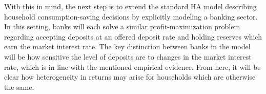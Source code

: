 \par With this in mind, the next step is to extend the standard HA model describing household consumption-saving decisions by explicitly modeling a banking sector. In this setting, banks will each solve a similar profit-maximization problem regarding accepting deposits at an offered deposit rate and holding reserves which earn the market interest rate. The key distinction between banks in the model will be how sensitive the level of deposits are to changes in the market interest rate, which is in line with the mentioned empirical evidence. From here, it will be clear how heterogeneity in returns may arise for households which are otherwise the same.